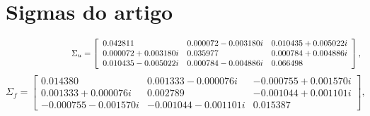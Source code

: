 \section{Sigmas do artigo }
\begin{equation}\label{matriz_sigma_gamf_1}
	\hspace{2.75cm} \Sigma_{u}= \left[
\begin{array}{lll}
0.042811            & 0.000072-0.003180i & 0.010435+0.005022i\\
0.000072+0.003180i  & 0.035977           & 0.000784+0.004886i\\
0.010435-0.005022i  & 0.000784-0.004886i & 0.066498
\end{array}
\right],
\end{equation}
\begin{equation}\label{matriz_sigma_gamf_2}
 \Sigma_{f}= \left[
\begin{array}{lll}
0.014380            & 0.001333-0.000076i & -0.000755+0.001570i\\
0.001333+0.000076i  & 0.002789           & -0.001044+0.001101i\\
-0.000755-0.001570i &-0.001044-0.001101i & 0.015387
\end{array}
\right],
\end{equation}





